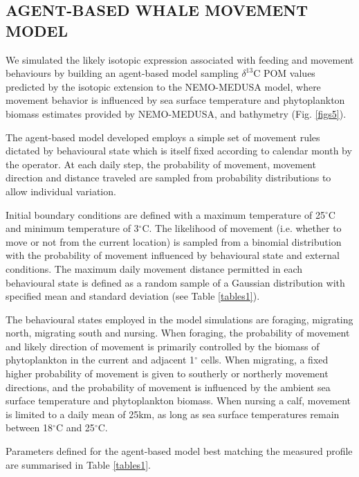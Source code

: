 \documentclass[a4paper,12pt]{article}
\begin{document}
\subsection*{AGENT-BASED WHALE MOVEMENT MODEL}
We simulated the likely isotopic expression associated with feeding and movement behaviours by building an agent-based model sampling $\delta^{13}$C POM values predicted by the isotopic extension to the NEMO-MEDUSA model\cite{magozzi2017using,yool2013medusa}, where movement behavior is influenced by sea surface temperature and phytoplankton biomass estimates provided by NEMO-MEDUSA\cite{yool2013medusa}, and bathymetry (Fig. \ref{figs5}).
 
The agent-based model developed employs a simple set of movement rules dictated by behavioural state which is itself fixed according to calendar month by the operator. 
At each daily step, the probability of movement, movement direction and distance traveled are sampled from probability distributions to allow individual variation.

Initial boundary conditions are defined with a maximum temperature of 25$^{\circ}$C and minimum temperature of 3$^{\circ}$C. The likelihood of movement (i.e. whether to move or not from the current location) is sampled from a binomial distribution with the probability of movement influenced by behavioural state and external conditions. 
The maximum daily movement distance permitted in each behavioural state is defined as a random sample of a Gaussian distribution with specified mean and standard deviation (see Table \ref{tables1}).
 
The behavioural states employed in the model simulations are foraging, migrating north, migrating south and nursing. When foraging, the probability of movement and likely direction of movement is primarily controlled by the biomass of phytoplankton in the current and adjacent 1$^{\circ}$ cells. When migrating, a fixed higher probability of movement is given to southerly or northerly movement directions, and the probability of movement is influenced by the ambient sea surface temperature and phytoplankton biomass. When nursing a calf, movement is limited to a daily mean of 25km, as long as sea surface temperatures remain between 18$^{\circ}$C and 25$^{\circ}$C.
 
Parameters defined for the agent-based model best matching the measured profile are summarised in Table \ref{tables1}.

\newpage
\end{document}
